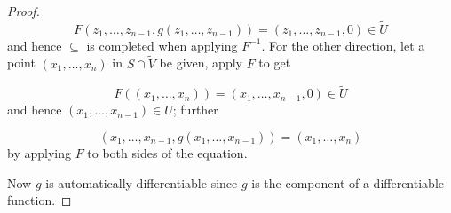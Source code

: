 \begin{proof}
\[F(z_1, \ldots, z_{n-1}, g(z_1, \ldots, z_{n-1})) = (z_1, \ldots, z_{n-1}, 0) \in \tilde U\]
and hence \(\subseteq\) is completed when applying \(F^{-1}\). For the
other direction, let a point \((x_1, \ldots, x_n)\) in
\(S \cap \tilde V\) be given, apply \(F\) to get

\[F((x_1, \ldots, x_n)) = (x_1, \ldots, x_{n-1}, 0) \in \tilde U\] and
hence \((x_1, \ldots, x_{n-1}) \in U\); further

\[(x_1, \ldots, x_{n-1}, g(x_1, \ldots, x_{n-1})) = (x_1, \ldots, x_n)\]
by applying \(F\) to both sides of the equation.

Now \(g\) is automatically differentiable since $g$ is  the component of a
differentiable function.
 
\end{proof}
 